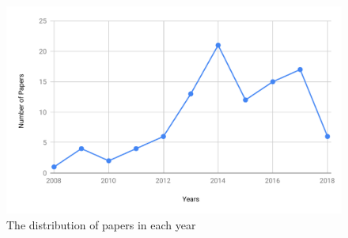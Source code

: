 
\begin{figure}
\centering
\includegraphics[width=0.7\linewidth]{figure/literature_years}
\vspace{-1.5em}
	\caption{The distribution of papers in each year}
	\vspace{-1em}
\label{fig:literature_years}
\end{figure}
